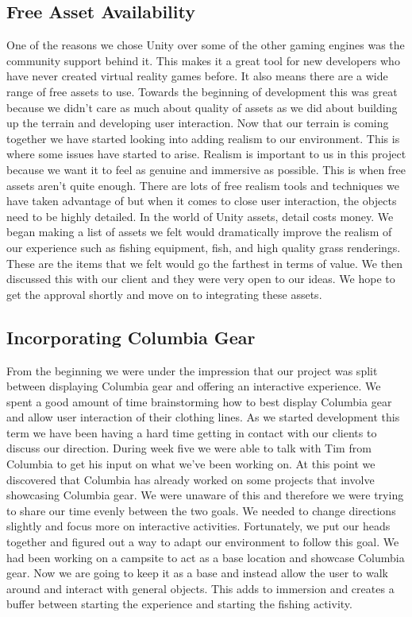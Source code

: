 \documentclass[10pt,journal,compsoc,onecolumn, draftclsnofoot]{IEEEtran}
\begin{document}
\subsection{Free Asset Availability}
One of the reasons we chose Unity over some of the other gaming engines was the community support behind it.
This makes it a great tool for new developers who have never created virtual reality games before.
It also means there are a wide range of free assets to use.
Towards the beginning of development this was great because we didn’t care as much about quality of assets as we did about building up the terrain and developing user interaction.
Now that our terrain is coming together we have started looking into adding realism to our environment.
This is where some issues have started to arise.
Realism is important to us in this project because we want it to feel as genuine and immersive as possible.
This is when free assets aren’t quite enough.
There are lots of free realism tools and techniques we have taken advantage of but when it comes to close user interaction, the objects need to be highly detailed.
In the world of Unity assets, detail costs money. We began making a list of assets we felt would dramatically improve the realism of our experience such as fishing equipment, fish, and high quality grass renderings.
These are the items that we felt would go the farthest in terms of value.
We then discussed this with our client and they were very open to our ideas.
We hope to get the approval shortly and move on to integrating these assets.

\subsection{Incorporating Columbia Gear}
From the beginning we were under the impression that our project was split between displaying Columbia gear and offering an interactive experience.
We spent a good amount of time brainstorming how to best display Columbia gear and allow user interaction of their clothing lines.
As we started development this term we have been having a hard time getting in contact with our clients to discuss our direction.
During week five we were able to talk with Tim from Columbia to get his input on what we've been working on.
At this point we discovered that Columbia has already worked on some projects that involve showcasing Columbia gear.
We were unaware of this and therefore we were trying to share our time evenly between the two goals.
We needed to change directions slightly and focus more on interactive activities.
Fortunately, we put our heads together and figured out a way to adapt our environment to follow this goal.
We had been working on a campsite to act as a base location and showcase Columbia gear.
Now we are going to keep it as a base and instead allow the user to walk around and interact with general objects.
This adds to immersion and creates a buffer between starting the experience and starting the fishing activity.
\end{document}
